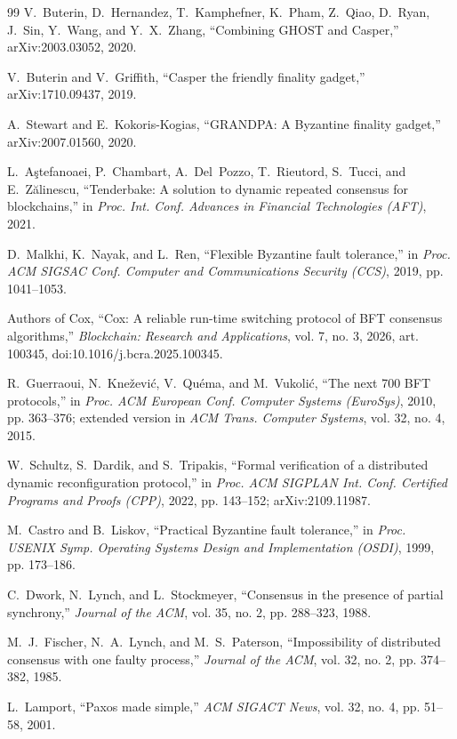 \documentclass[journal]{IEEEtran}
\begin{document}
\begin{thebibliography}{99}
 V.~Buterin, D.~Hernandez, T.~Kamphefner, K.~Pham, Z.~Qiao, D.~Ryan, J.~Sin,
Y.~Wang, and Y.~X.~Zhang, ``Combining GHOST and Casper,'' arXiv:2003.03052, 2020.

 V.~Buterin and V.~Griffith, ``Casper the friendly finality gadget,''
arXiv:1710.09437, 2019.

 A.~Stewart and E.~Kokoris-Kogias, ``GRANDPA: A Byzantine finality gadget,''
arXiv:2007.01560, 2020.

 L.~A\c{s}tefanoaei, P.~Chambart, A.~Del~Pozzo, T.~Rieutord, S.~Tucci, and
E.~Z\u{a}linescu, ``Tenderbake: A solution to dynamic repeated consensus for blockchains,'' in
\emph{Proc. Int. Conf. Advances in Financial Technologies (AFT)}, 2021.

 D.~Malkhi, K.~Nayak, and L.~Ren, ``Flexible Byzantine fault tolerance,'' in
\emph{Proc. ACM SIGSAC Conf. Computer and Communications Security (CCS)}, 2019, pp. 1041--1053.

 Authors of Cox, ``Cox: A reliable run-time switching protocol of BFT consensus
algorithms,'' \emph{Blockchain: Research and Applications}, vol. 7, no. 3, 2026,
art. 100345, doi:10.1016/j.bcra.2025.100345.

 R.~Guerraoui, N.~Knežević, V.~Quéma, and M.~Vukolić, ``The next 700 BFT
protocols,'' in \emph{Proc. ACM European Conf. Computer Systems (EuroSys)}, 2010, pp. 363--376;
extended version in \emph{ACM Trans. Computer Systems}, vol. 32, no. 4, 2015.

 W.~Schultz, S.~Dardik, and S.~Tripakis, ``Formal verification of a
distributed dynamic reconfiguration protocol,'' in \emph{Proc. ACM SIGPLAN Int. Conf. Certified
Programs and Proofs (CPP)}, 2022, pp. 143--152; arXiv:2109.11987.

 M.~Castro and B.~Liskov, ``Practical Byzantine fault tolerance,'' in \emph{Proc.
USENIX Symp. Operating Systems Design and Implementation (OSDI)}, 1999, pp. 173--186.

 C.~Dwork, N.~Lynch, and L.~Stockmeyer, ``Consensus in the presence of partial
synchrony,'' \emph{Journal of the ACM}, vol. 35, no. 2, pp. 288--323, 1988.

 M.~J.~Fischer, N.~A.~Lynch, and M.~S.~Paterson, ``Impossibility of distributed
consensus with one faulty process,'' \emph{Journal of the ACM}, vol. 32, no. 2, pp. 374--382,
1985.

 L.~Lamport, ``Paxos made simple,'' \emph{ACM SIGACT News}, vol. 32, no. 4,
pp. 51--58, 2001.


\end{thebibliography}
\end{document}

